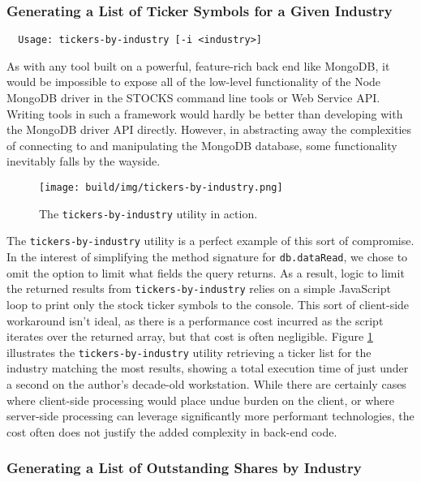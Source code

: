 \documentclass[
11pt,
titlepage,
]{article}
\begin{document}
\subsubsection{Generating a List of Ticker Symbols for a Given Industry}

\begin{lstlisting}
  Usage: tickers-by-industry [-i <industry>]
\end{lstlisting}

As with any tool built on a powerful, feature-rich back end like MongoDB, it
would be impossible to expose all of the low-level functionality of the Node
MongoDB driver in the STOCKS command line tools or Web Service API. Writing
tools in such a framework would hardly be better than developing with the
MongoDB driver API directly. However, in abstracting away the complexities of
connecting to and manipulating the MongoDB database, some functionality
inevitably falls by the wayside.

\begin{figure}[bp]
  \texttt{[image: build/img/tickers-by-industry.png]}
  \caption{The \texttt{tickers-by-industry} utility in action.}
  \label{fig:tickers-by-industry}
\end{figure}

The \texttt{tickers-by-industry} utility is a perfect example of this sort of
compromise. In the interest of simplifying the method signature for
\texttt{db.dataRead}, we chose to omit the option to limit what fields the query
returns. As a result, logic to limit the returned results from
\texttt{tickers-by-industry} relies on a simple JavaScript loop to print only
the stock ticker symbols to the console. This sort of client-side workaround
isn't ideal, as there is a performance cost incurred as the script iterates over
the returned array, but that cost is often negligible. Figure
\ref{fig:tickers-by-industry} illustrates the \texttt{tickers-by-industry}
utility retrieving a ticker list for the industry matching the most results,
showing a total execution time of just under a second on the author's decade-old
workstation. While there are certainly cases where client-side
processing would place undue burden on the client, or where server-side
processing can leverage significantly more performant technologies, the cost
often does not justify the added complexity in back-end code.

\subsubsection{Generating a List of Outstanding Shares by Industry}
\end{document}
